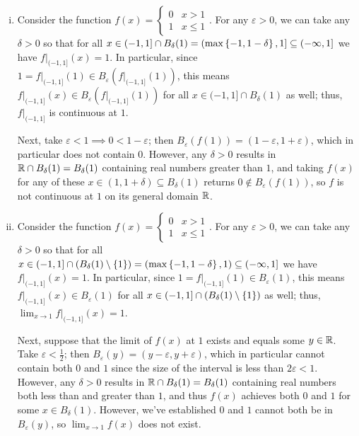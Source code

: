 \documentclass[main.tex]{subfiles}
\begin{document}
\begin{soln}
    \begin{enumerate}[(i)]
        \item Consider the function $f(x) = \begin{cases}
            0 & x > 1 \\
            1 & x \le 1
        \end{cases}$. For any $\varepsilon > 0$, we can take any $\delta > 0$ so that for all $x\in (-1, 1]\cap B_\delta(1) = (\max\left\{ -1, 1 - \delta \right\}, 1]\subseteq (-\infty, 1]$ we have $f|_{(-1, 1]}(x) = 1$. In particular, since $1 = f|_{(-1, 1]}(1) \in B_\varepsilon(f|_{(-1, 1]}(1))$, this means $f|_{(-1, 1]}(x) \in B_\varepsilon(f|_{(-1, 1]}(1))$ for all $x\in (-1, 1]\cap B_\delta(1)$ as well; thus, $f|_{(-1, 1]}$ is continuous at $1$.
        
        Next, take $\varepsilon < 1\implies 0 < 1 - \varepsilon$; then $B_\varepsilon(f(1)) = (1 - \varepsilon, 1 + \varepsilon)$, which in particular does not contain $0$. However, any $\delta > 0$ results in $\mathbb R\cap B_\delta(1) = B_\delta(1)$ containing real numbers greater than $1$, and taking $f(x)$ for any of these $x\in (1, 1 + \delta)\subseteq B_\delta(1)$ returns $0\not\in B_\varepsilon(f(1))$, so $f$ is not continuous at $1$ on its general domain $\mathbb R$.

        \item Consider the function $f(x) = \begin{cases}
            0 & x > 1 \\
            1 & x \le 1
        \end{cases}$. For any $\varepsilon > 0$, we can take any $\delta > 0$ so that for all $x\in (-1, 1]\cap \left( B_\delta(1)\setminus\left\{ 1 \right\} \right) = (\max\left\{ -1, 1 - \delta \right\}, 1)\subseteq (-\infty, 1]$ we have $f|_{(-1, 1]}(x) = 1$. In particular, since $1 = f|_{(-1, 1]}(1) \in B_\varepsilon(1)$, this means $f|_{(-1, 1]}(x) \in B_\varepsilon(1)$ for all $x\in (-1, 1]\cap \left( B_\delta(1)\setminus\left\{ 1 \right\} \right)$ as well; thus, $\lim_{x\to 1}f|_{(-1, 1]}(x) = 1$.
        
        Next, suppose that the limit of $f(x)$ at $1$ exists and equals some $y\in \mathbb R$. Take $\varepsilon < \frac{1}{2}$; then $B_\varepsilon(y) = (y - \varepsilon, y + \varepsilon)$, which in particular cannot contain both $0$ and $1$ since the size of the interval is less than $2\varepsilon < 1$. However, any $\delta > 0$ results in $\mathbb R\cap B_\delta(1) = B_\delta(1)$ containing real numbers both less than and greater than $1$, and thus $f(x)$ achieves both $0$ and $1$ for some $x\in B_\delta(1)$. However, we've established $0$ and $1$ cannot both be in $B_\varepsilon(y)$, so $\lim_{x\to 1} f(x)$ does not exist.
    \end{enumerate}
\end{soln}
\eject
\end{document}
